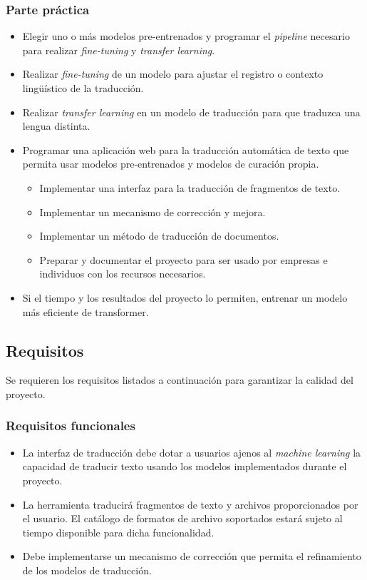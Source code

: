 \subsubsection*{Parte práctica}
    \begin{itemize}
        \item Elegir uno o más modelos pre-entrenados y programar el \textit{pipeline} necesario para
        realizar \textit{fine-tuning} y \textit{transfer learning}.
        \item Realizar \textit{fine-tuning} de un modelo para ajustar el registro o contexto
        lingüístico de la traducción.
        \item Realizar \textit{transfer learning} en un modelo de traducción para que traduzca
        una lengua distinta.
        \item Programar una aplicación web para la traducción automática de texto que permita
        usar modelos pre-entrenados y modelos de curación propia.
            \begin{itemize}
                \item Implementar una interfaz para la traducción de fragmentos de texto.
                \item Implementar un mecanismo de corrección y mejora.
                \item Implementar un método de traducción de documentos.
                \item Preparar y documentar el proyecto para ser usado por empresas e individuos con
                    los recursos necesarios.
            \end{itemize}
        \item Si el tiempo y los resultados del proyecto lo permiten, entrenar un modelo más eficiente
            de transformer.
    \end{itemize}



\subsection{Requisitos}
Se requieren los requisitos listados a continuación para garantizar la calidad del proyecto.

\subsubsection{Requisitos funcionales}
\begin{itemize}
    \item La interfaz de traducción debe dotar a usuarios ajenos al \textit{machine learning} la capacidad
    de traducir texto usando los modelos implementados durante el proyecto.
    \item La herramienta traducirá fragmentos de texto y archivos proporcionados por el usuario. 
    El catálogo de formatos de archivo soportados estará sujeto al tiempo disponible para
    dicha funcionalidad.
    \item Debe implementarse un mecanismo de corrección que permita el refinamiento de los modelos
    de traducción.
\end{itemize}


